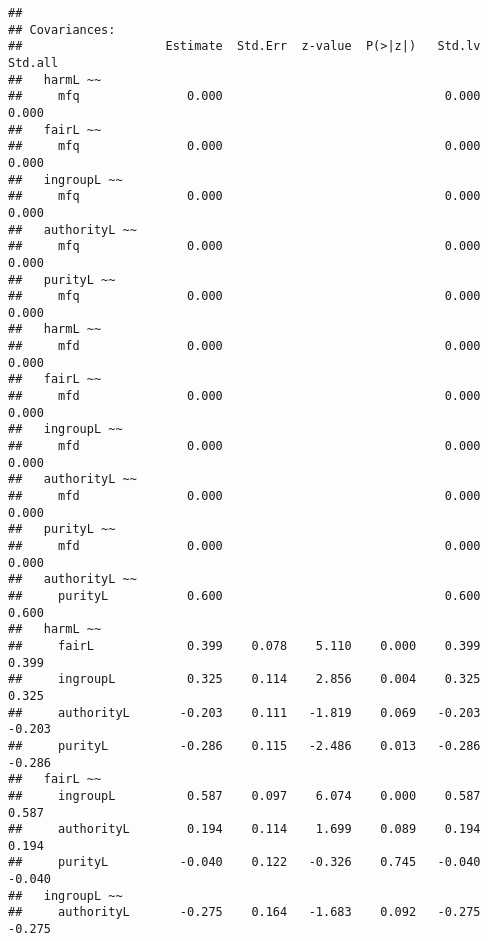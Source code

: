\documentclass[english,man]{apa6}
\newcounter{author}
\theoremstyle{definition}
\theoremstyle{definition}
\theoremstyle{definition}
\theoremstyle{remark}
\begin{document}
\begin{verbatim}
## 
## Covariances:
##                    Estimate  Std.Err  z-value  P(>|z|)   Std.lv  Std.all
##   harmL ~~                                                              
##     mfq               0.000                               0.000    0.000
##   fairL ~~                                                              
##     mfq               0.000                               0.000    0.000
##   ingroupL ~~                                                           
##     mfq               0.000                               0.000    0.000
##   authorityL ~~                                                         
##     mfq               0.000                               0.000    0.000
##   purityL ~~                                                            
##     mfq               0.000                               0.000    0.000
##   harmL ~~                                                              
##     mfd               0.000                               0.000    0.000
##   fairL ~~                                                              
##     mfd               0.000                               0.000    0.000
##   ingroupL ~~                                                           
##     mfd               0.000                               0.000    0.000
##   authorityL ~~                                                         
##     mfd               0.000                               0.000    0.000
##   purityL ~~                                                            
##     mfd               0.000                               0.000    0.000
##   authorityL ~~                                                         
##     purityL           0.600                               0.600    0.600
##   harmL ~~                                                              
##     fairL             0.399    0.078    5.110    0.000    0.399    0.399
##     ingroupL          0.325    0.114    2.856    0.004    0.325    0.325
##     authorityL       -0.203    0.111   -1.819    0.069   -0.203   -0.203
##     purityL          -0.286    0.115   -2.486    0.013   -0.286   -0.286
##   fairL ~~                                                              
##     ingroupL          0.587    0.097    6.074    0.000    0.587    0.587
##     authorityL        0.194    0.114    1.699    0.089    0.194    0.194
##     purityL          -0.040    0.122   -0.326    0.745   -0.040   -0.040
##   ingroupL ~~                                                           
##     authorityL       -0.275    0.164   -1.683    0.092   -0.275   -0.275

\end{verbatim}
\end{document}
